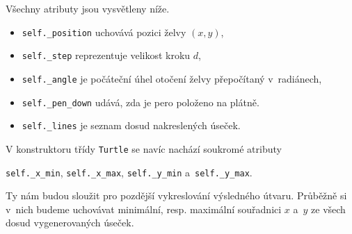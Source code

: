 Všechny atributy jsou vysvětleny níže.
\begin{itemize}
    \item \texttt{self.\_position} uchovává pozici želvy $(x,y)$,
    \item \texttt{self.\_step} reprezentuje velikost kroku $d$,
    \item \texttt{self.\_angle} je počáteční úhel otočení želvy přepočítaný v~radiánech,
    \item \texttt{self.\_pen\_down} udává, zda je pero položeno na plátně.
    \item \texttt{self.\_lines} je seznam dosud nakreslených úseček.
\end{itemize}
V konstruktoru třídy \texttt{Turtle} se navíc nachází soukromé atributy
\begin{center}
    \texttt{self.\_x\_min}, \texttt{self.\_x\_max}, \texttt{self.\_y\_min} a~\texttt{self.\_y\_max}.
\end{center}
Ty nám budou sloužit pro pozdější vykreslování výsledného útvaru. Průběžně si v~nich budeme uchovávat minimální, resp. maximální souřadnici $x$ a~$y$ ze všech dosud vygenerovaných úseček.

